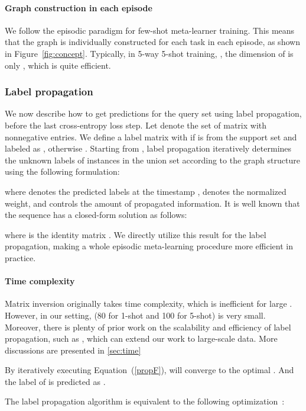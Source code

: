 \documentclass{article} \usepackage{iclr2019_conference,times}
\begin{document}
\paragraph{Graph construction in each episode} We follow the episodic paradigm for few-shot meta-learner training. This means that the graph is individually constructed for each task in each episode, as shown in Figure~\ref{fig:concept}. Typically, in 5-way 5-shot training, , the dimension of  is only , which is quite efficient. 



\subsubsection{Label propagation}
\label{lp}
We now describe how to get predictions for the query set  using label propagation, before the last cross-entropy loss step. Let  denote the set of  matrix with nonnegative entries.  We define a label matrix  with  if  is from the support set and labeled as , otherwise . Starting from , label propagation iteratively determines 
the unknown labels of instances in the union set  according to the graph structure using the following formulation:

where  denotes the predicted labels at the timestamp , 
 denotes the normalized weight, and  controls the amount of propagated information. It is well known that the sequence  has a closed-form solution as follows:

where  is the identity matrix \citep{labelprop1}. We directly utilize this result for the label propagation, making a whole
episodic meta-learning procedure more efficient in practice. 

\paragraph{Time complexity} Matrix inversion originally takes  time complexity, which is inefficient for large . However, in our setting,  (80 for 1-shot and 100 for 5-shot) is very small. Moreover, there is plenty of prior work on the scalability and efficiency of label propagation, such as \cite{scale1,scale2}, which can extend our work to large-scale data. More discussions are presented in \ref{sec:time}

\if
By iteratively executing Equation~(\ref{propF}),  will converge to the optimal . And the label of  is predicted as .

The label propagation algorithm is equivalent to the following optimization~\citep{labelprop1}:
\end{document}
